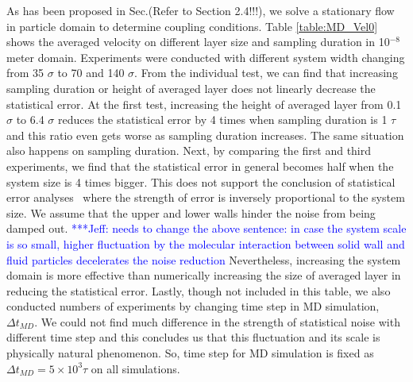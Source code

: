 \documentclass[preprint,12pt]{elsarticle}
\newcommand{\skonote}[1]{ {\textcolor{blue} { ***Jeff: #1 }}}
\newcommand{\skonote}[1]{}
\begin{document}
As has been proposed in Sec.(Refer to Section 2.4!!!), we solve a stationary flow in particle domain to determine coupling conditions. Table \ref{table:MD_Vel0} shows the averaged velocity on different layer size and sampling duration in 10$^{-8}$ meter domain. Experiments were conducted with different system width changing from 35 $\sigma$ to 70 and 140 $\sigma$. From the individual test, we can find that increasing sampling duration or height of averaged layer does not linearly decrease the statistical error. At the first test, increasing the height of averaged layer from 0.1 $\sigma$ to 6.4 $\sigma$ reduces the statistical error by 4 times when sampling duration is 1 $\tau$ and this ratio even gets worse as sampling duration increases. The same situation also happens on sampling duration. Next, by comparing the first and third experiments, we find that the statistical error in general becomes half when the system size is 4 times bigger. This does not support the conclusion of statistical error analyses~\cite{Hadjicon3,Time_Mechanism} where the strength of error is inversely proportional to the system size. We assume that the upper and lower walls hinder the noise from being damped out.\skonote{needs to change the above sentence: in case the system scale is so small, higher fluctuation by the molecular interaction between solid wall and fluid particles decelerates the noise reduction} Nevertheless, increasing the system domain is more effective than numerically increasing the size of averaged layer in reducing the statistical error. Lastly, though not included in this table, we also conducted numbers of experiments by changing time step in MD simulation, $\Delta t_{MD}$. We could not find much difference in the strength of statistical noise with different time step and this concludes us that this fluctuation and its scale is physically natural phenomenon. So, time step for MD simulation is fixed as $\Delta t_{MD}=5 \times 10^3 \tau$ on all simulations.
\end{document}
